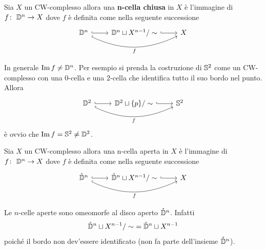 \begin{definition}
	Sia $X$ un CW-complesso allora una \textbf{n-cella chiusa} in $X$ è l'immagine di $\morphism{f}{\D^n}{X}$ dove $f$ è definita come nella seguente successione
	\begin{equation*}
	\begin{tikzcd}
		\D^n \arrow[bend right=25, swap, hook]{rr}{f} \arrow[r,hook] & \D^n \sqcup X^{n-1} / \sim \arrow[r,hook] & X
	\end{tikzcd}
	\end{equation*}
\end{definition}

\begin{remark}
	In generale $\image{f} \neq \D^n$. Per esempio si prenda la costruzione di $\S^2$ come un CW-complesso con una $0$-cella e una $2$-cella che identifica tutto il suo bordo nel punto. Allora 
	\begin{equation*}
	\begin{tikzcd}
		\D^2 \arrow[bend right=25, swap, hook]{rr}{f} \arrow[r,hook] & \D^2 \sqcup \{p\} / \sim \arrow[r,hook] & \S^2
	\end{tikzcd}
	\end{equation*}
	è ovvio che $\image{f} = \S^2 \neq \D^2$. 
\end{remark}

\begin{definition}
	Sia $X$ un CW-complesso allora una n-cella aperta in $X$ è l'immagine di $\morphism{f}{\D^n}{X}$ dove $f$ è definita come nella seguente successione
	\begin{equation}
	\begin{tikzcd}
	\mathring{\D}^n \arrow[bend right=25, swap, hook]{rr}{f} \arrow[r,hook] & \mathring{\D}^n \sqcup X^{n-1} / \sim \arrow[r,hook] & X
	\end{tikzcd}
	\end{equation}
\end{definition}

\begin{remark}
	Le $n$-celle aperte sono omeomorfe al disco aperto $\mathring{\D}^n$. Infatti 
	\begin{equation*}
		\mathring{\D}^n \sqcup X^{n-1} / \sim\ = \mathring{\D}^n \sqcup X^{n-1}
	\end{equation*}
	poiché il bordo non dev'essere identificato (non fa parte dell'insieme $\mathring{\D}^n$).
\end{remark}

